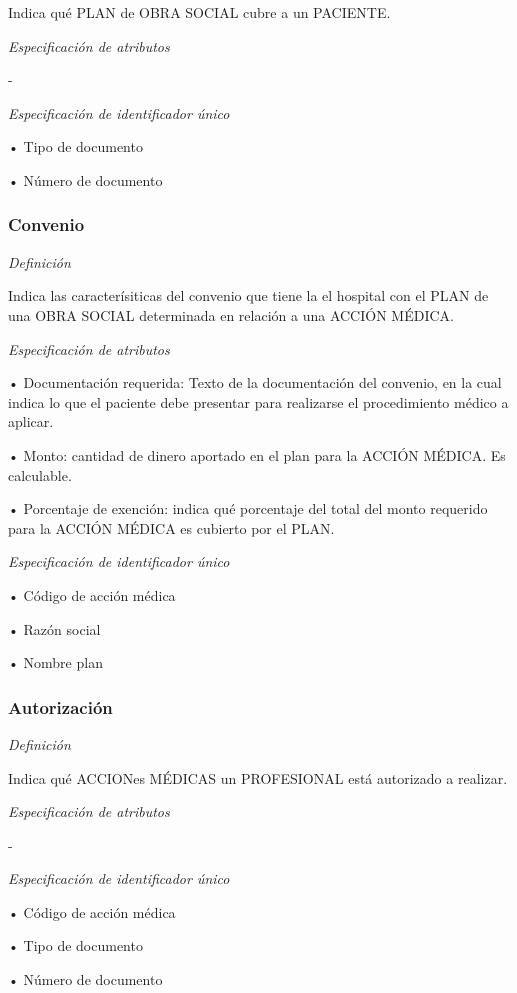 \documentclass[a4paper,11pt]{article}
\begin{document}
Indica qué PLAN de OBRA SOCIAL cubre a un PACIENTE.

\textit{Especificación de atributos}

-

\textit{Especificación de identificador único}

• Tipo de documento

• Número de documento\label{HToc293405823}

\subsubsection{\textbf{Convenio}}

\textit{Definición}

Indica las caracterísiticas del convenio que tiene la el hospital con el PLAN 
de una OBRA SOCIAL determinada en relación a una ACCIÓN MÉDICA.

\textit{Especificación de atributos}

• Documentación requerida: Texto de la documentación del convenio, en la cual 
indica lo que el paciente debe presentar para realizarse el procedimiento médico 
a aplicar.

• Monto: cantidad de dinero aportado en el plan para la ACCIÓN MÉDICA. Es calculable.

• Porcentaje de exención: indica qué porcentaje del total del monto requerido 
para la ACCIÓN MÉDICA es cubierto por el PLAN.

\textit{Especificación de identificador único}

• Código de acción médica

• Razón social

• Nombre plan\label{HToc293405824}

\subsubsection{\textbf{Autorización}}

\textit{Definición}

Indica qué ACCIONes MÉDICAS un PROFESIONAL está autorizado a realizar.

\textit{Especificación de atributos}

-

\textit{Especificación de identificador único}

• Código de acción médica

• Tipo de documento

• Número de documento\label{HToc293405825}
\end{document}
